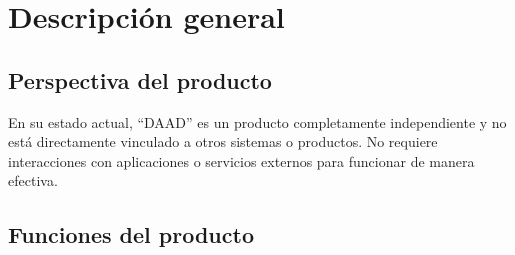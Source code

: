 \section{Descripción general}

\subsection{Perspectiva del producto}

En su estado actual, ``DAAD'' es un producto completamente independiente y no está directamente vinculado a otros sistemas o productos. No requiere interacciones con aplicaciones o servicios externos para funcionar de manera efectiva.


\subsection{Funciones del producto}

